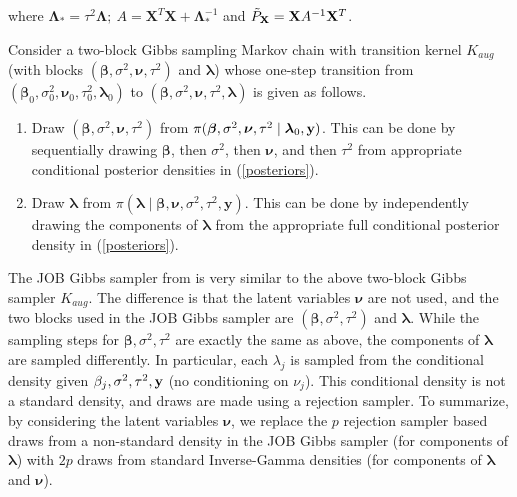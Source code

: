 \documentclass[noinfoline,11pt]{imsart}
\numberwithin{equation}{section}
\theoremstyle{plain}
\newcommand{\y}{\mathbf{y}}
\newcommand{\X}{\mathbf{X}}
\newcommand{\Bl}{\boldsymbol{\Lambda}}
\newcommand\Myciteauthor[1]{\citeauthor{#1} \cite{#1}}
\begin{document}
\noindent
where $\Bl_*=\tau^2\Bl;\ A=\X^T\X+\Bl_*^{-1}$ and $\Tilde{P}_\X=\X 
A^{-1}\X^T$. 

Consider a two-block Gibbs sampling Markov chain with transition kernel 
$K_{aug}$ (with blocks $({\boldsymbol \beta}, \sigma^2, {\boldsymbol \nu}, 
\tau^2)$ and ${\boldsymbol \lambda}$) 
whose one-step transition from $({\boldsymbol \beta}_0, \sigma^2_0, {\boldsymbol \nu}_0, \tau^2_0, {\boldsymbol \lambda}_0)$ to 
$({\boldsymbol \beta}, \sigma^2, {\boldsymbol \nu}, \tau^2, {\boldsymbol \lambda})$ is given as follows. 
\begin{enumerate}
    \item Draw $({\boldsymbol \beta}, \sigma^2, {\boldsymbol \nu}, \tau^2)$ from $\pi({\boldsymbol \beta}, \sigma^2, {\boldsymbol \nu}, \tau^2 \mid {\boldsymbol \lambda}_0, {\bf y})$. This can be 
    done by sequentially drawing ${\boldsymbol \beta}$, then $\sigma^2$, 
    then ${\boldsymbol \nu}$, and then $\tau^2$ from appropriate conditional posterior densities in (\ref{posteriors}). 
    \item Draw ${\boldsymbol \lambda}$ from $\pi({\boldsymbol \lambda} \mid \boldsymbol{\beta,\nu},\sigma^2,\tau^2,\mathbf{\y})$. This can be done by 
    independently drawing the components of ${\boldsymbol \lambda}$ from the 
    appropriate full conditional posterior density in (\ref{posteriors}). 
\end{enumerate}

\noindent
The JOB Gibbs sampler from \Myciteauthor{johndrow2017bayes} is very similar to the above two-block Gibbs sampler $K_{aug}$. The difference is that the latent variables ${\boldsymbol \nu}$ are not used, and the two blocks used in the JOB Gibbs sampler are $({\boldsymbol \beta}, \sigma^2, \tau^2)$ and ${\boldsymbol \lambda}$. While the sampling steps for ${\boldsymbol \beta}, \sigma^2, \tau^2$
are exactly the same as above, the components of ${\boldsymbol \lambda}$ are sampled differently. In particular, each $\lambda_j$ is sampled from the conditional density given $\beta_j, \sigma^2, \tau^2, {\bf y}$ (no conditioning on $\nu_j$). This conditional density is not a standard density, and draws are made using a rejection sampler. To summarize, by considering the latent variables ${\boldsymbol \nu}$, we replace the $p$ rejection sampler based 
draws from a non-standard density in the JOB Gibbs sampler (for components of ${\boldsymbol \lambda}$) with $2p$ draws from standard Inverse-Gamma densities (for components of 
${\boldsymbol \lambda}$ and ${\boldsymbol \nu}$). 
\end{document}
